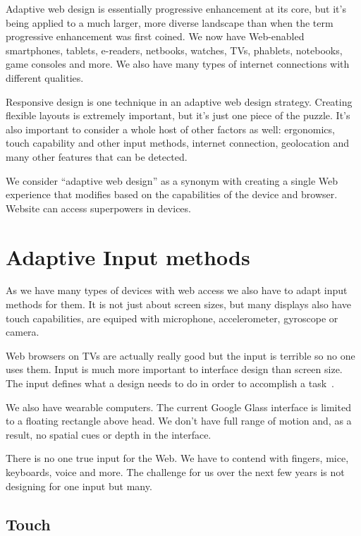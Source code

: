 \documentclass{iitsrc}
\begin{document}
Adaptive web design is essentially progressive enhancement at its core, but it’s being applied to a much larger, more diverse landscape than when the term progressive enhancement was first coined. We now have Web-enabled smartphones, tablets, e-readers, netbooks, watches, TVs, phablets, notebooks, game consoles and more. We also have many types of internet connections with different qualities.

Responsive design is one technique in an adaptive web design strategy. Creating flexible layouts is extremely important, but it’s just one piece of the puzzle. It’s also important to consider a whole host of other factors as well: ergonomics, touch capability and other input methods, internet connection, geolocation and many other features that can be detected.

We consider “adaptive web design” as a synonym with creating a single Web experience that modifies based on the capabilities of the device and browser. Website can access superpowers in devices.


\section{Adaptive Input methods}

As we have many types of devices with web access we also have to adapt input methods for them. It is not just about screen sizes, but many displays also have touch capabilities, are equiped with microphone, accelerometer, gyroscope or camera.

Web browsers on TVs are actually really good but the input is terrible so no one uses them. Input is much more important to interface design than screen size. The input defines what a design needs to do in order to accomplish a task~\cite{adaptiveinput}.

We also have wearable computers. The current Google Glass interface is limited to a floating rectangle above head. We don’t have full range of motion and, as a result, no spatial cues or depth in the interface.

There is no one true input for the Web. We have to contend with fingers, mice, keyboards, voice and more. The challenge for us over the next few years is not designing for one input but many.

\subsection{Touch} %
\label{sub:touch}
\end{document}

